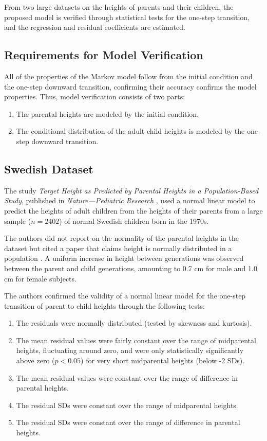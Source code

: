 \documentclass{svproc} %
\begin{document}
From two large datasets on the heights of parents and their children, the proposed model is verified through statistical tests for the one-step transition, and the regression and residual coefficients are estimated.

\subsection{Requirements for Model Verification} \label{verify}

All of the properties of the Markov model follow from the initial condition and the one-step downward transition, confirming their accuracy confirms the model properties. Thus, model verification consists of two parts:
\begin{enumerate}
\item The parental heights are modeled by the initial condition.
\item The conditional distribution of the adult child heights is modeled by the one-step downward transition.
\end{enumerate}



\subsection{Swedish Dataset}

The study \emph{Target Height as Predicted by Parental Heights in a Population-Based Study}, published in \emph{Nature---Pediatric Research} \cite{luo}, used a normal linear model to predict the heights of adult children from the heights of their parents from a large sample ($n = 2402$) of normal Swedish children born in the 1970s. 

The authors did not report on the normality of the parental heights in the dataset but cited a paper that claims height is normally distributed in a population \cite{preece}. A uniform increase in height between generations was observed between the parent and child generations, amounting to 0.7 cm for male and 1.0 cm for female subjects. 

The authors confirmed the validity of a normal linear model for the one-step transition of parent to child heights through the following tests:
\begin{enumerate}
\item The residuals were normally distributed (tested by skewness and kurtosis).
\item The mean residual values were fairly constant over the range of midparental heights, fluctuating around zero, and were only statistically significantly above zero ($p < 0.05$) for very short midparental heights (below -2 SDs).
\item The mean residual values were constant over the range of difference in parental heights.
\item The residual SDs were constant over the range of midparental heights.
\item The residual SDs were constant over the range of difference in parental heights.
\end{enumerate}
\end{document}
